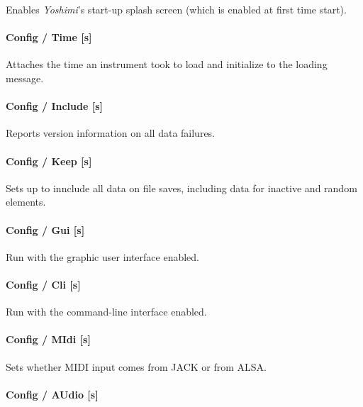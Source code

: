    Enables \textsl{Yoshimi}'s start-up splash screen (which is
   enabled at first time start).

\paragraph{Config / Time [s]}
\label{paragraph:command_line_config_time}

   Attaches the time an instrument took to load and initialize to the loading
   message.

\paragraph{Config / Include [s]}
\label{paragraph:command_line_config_include}

   Reports version information on all data failures.

\paragraph{Config / Keep [s]}
\label{paragraph:command_line_config_keep}

   Sets up to innclude all data on file saves, including data for
   inactive and random elements.

\paragraph{Config / Gui [s]}
\label{paragraph:command_line_config_gui}

   Run with the graphic user interface enabled.

\paragraph{Config / Cli [s]}
\label{paragraph:command_line_config_cli}

   Run with the command-line interface enabled.

\paragraph{Config / MIdi [s]}
\label{paragraph:command_line_config_midi}

   Sets whether MIDI input comes from JACK or from ALSA.

\paragraph{Config / AUdio [s]}
\label{paragraph:command_line_config_audio}

